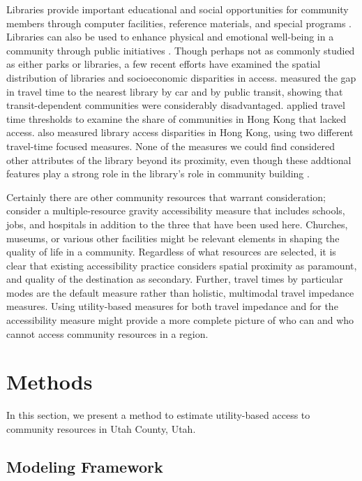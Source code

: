 \documentclass[3p, authoryear, review]{elsarticle} %
\begin{document}
Libraries provide important educational and social opportunities for community
members through computer facilities, reference materials, and special programs
\citep{maxwell2008libraries, barclay2017space}. Libraries can also be used to
enhance physical and emotional well-being in a community through public
initiatives \citep{philbin2019}. Though perhaps not as commonly studied as either
parks or libraries, a few recent efforts have examined the spatial distribution
of libraries and socioeconomic disparities in access. \citet{allen2019} measured the
gap in travel time to the nearest library by car and by public transit, showing
that transit-dependent communities were considerably disadvantaged. \citet{cheng2021}
applied travel time thresholds to examine the share of communities in Hong Kong
that lacked access. \citet{guo2017} also measured library access disparities in Hong Kong,
using two different travel-time focused measures. None of the measures we could
find considered other attributes of the library beyond its proximity, even though
these addtional features play a strong role in the library's role in community building
\citep{barclay2017space}.

Certainly there are other community resources that warrant consideration;
\citet{ermagun2020} consider a multiple-resource gravity accessibility measure that
includes schools, jobs, and hospitals in addition to the three that have been used here.
Churches, museums, or various other facilities might be relevant elements
in shaping the quality of life in a community. Regardless of what resources
are selected, it is clear that existing accessibility practice considers spatial
proximity as paramount, and quality of the destination as secondary. Further,
travel times by particular modes are the default measure rather than holistic,
multimodal travel impedance measures. Using utility-based measures for both
travel impedance and for the accessibility measure might provide a more
complete picture of who can and who cannot access community resources in a region.

\hypertarget{methods}{%
\section{Methods}\label{methods}}

In this section, we present a method to estimate utility-based access to
community resources in Utah County, Utah.

\hypertarget{framework}{%
\subsection{Modeling Framework}\label{framework}}
\end{document}
